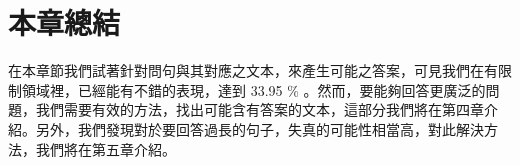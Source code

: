 \begin{figure}
\end{figure}
\section{本章總結}
在本章節我們試著針對問句與其對應之文本，來產生可能之答案，可見我們在有限制領域裡，已經能有不錯的表現，達到 33.95 \% 。然而，要能夠回答更廣泛的問題，我們需要有效的方法，找出可能含有答案的文本，這部分我們將在第四章介紹。另外，我們發現對於要回答過長的句子，失真的可能性相當高，對此解決方法，我們將在第五章介紹。
